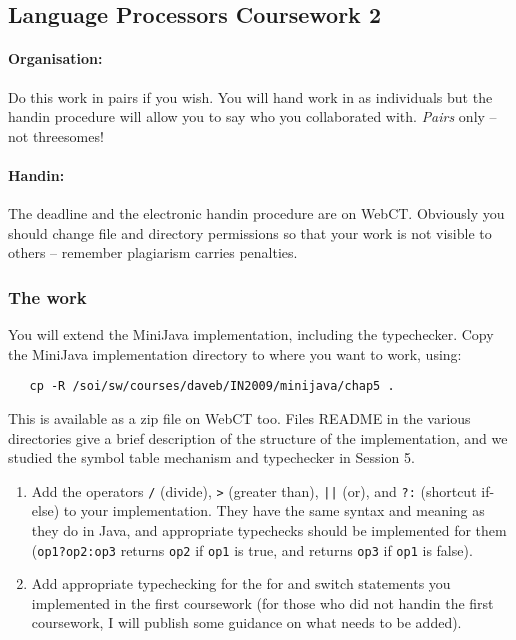 \documentclass[11pt]{article}
\begin{document}
\subsection*{Language Processors Coursework 2}

\paragraph{Organisation:}
Do this work in pairs if you wish. You will hand
work in as individuals but the handin procedure will allow 
you to say who you collaborated with. 
\emph{Pairs} only -- not threesomes!

\paragraph{Handin:} 
The deadline and the electronic handin procedure are
on WebCT.
Obviously you should change file and directory permissions so 
that your work is not visible to others -- 
remember plagiarism carries penalties. 

\subsubsection*{The work}

You will extend the MiniJava implementation, including
the typechecker. Copy the MiniJava implementation directory
to where you want to work, using:  
\begin{verbatim}
   cp -R /soi/sw/courses/daveb/IN2009/minijava/chap5 .
\end{verbatim}
This is available as a zip file on WebCT too.
Files README in the various directories give a brief
description of the structure of the implementation,
and we studied the symbol table mechanism and 
typechecker in Session 5.

\begin{enumerate}
\item Add the operators \verb+/+ (divide), \verb+>+ (greater than),
\verb+||+ (or), and \verb+?:+ (shortcut if-else) to your implementation.
They have the same syntax and meaning as they do in Java, 
and appropriate typechecks should be implemented for them
(\verb+op1?op2:op3+ returns \verb+op2+ if \verb+op1+ is true,
and returns \verb+op3+ if \verb+op1+ is false).


\item Add appropriate typechecking for the for and switch statements
you implemented in the first coursework (for those who did
not handin the first coursework, I will publish some
guidance on what needs to be added).
\end{enumerate}
\end{document}

